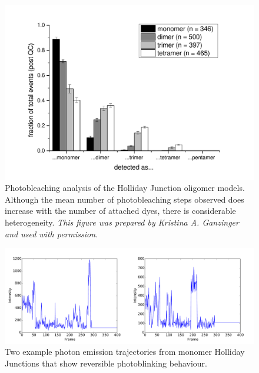 \begin{figure}
   \begin{center}
      \includegraphics*[width=5in]{sizing/results-holidayjunctions.pdf}
      \caption{Photobleaching analysis of the Holliday Junction oligomer models. Although the mean number of photobleaching steps observed does increase with the number of attached dyes, there is considerable heterogeneity. \emph{This figure was prepared by Kristina A. Ganzinger and used with permission}.}
      \label{fig:photobleaching}
   \end{center}
\end{figure}

\begin{figure}
   \begin{center}
      \includegraphics*[width=6in]{sizing/blinking_trajectories.pdf}
      \caption{Two example photon emission trajectories from monomer Holliday Junctions that show reversible photoblinking behaviour.}
      \label{fig:blinking}
   \end{center}
\end{figure}

